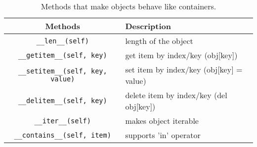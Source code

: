   \begin{definition}
    \begin{table}[H]
      \centering
      \begin{tabular}{|c|p{8cm}|}
        \hline
        \textbf{Methods} & \textbf{Description} \\
        \hline 
        \texttt{\_\_len\_\_(self)} & length of the object \\
        \hline
        \texttt{\_\_getitem\_\_(self, key)} & get item by index/key (obj[key]) \\
        \hline
        \texttt{\_\_setitem\_\_(self, key, value)} & set item by index/key (obj[key] = value) \\
        \hline
        \texttt{\_\_delitem\_\_(self, key)} & delete item by index/key (del obj[key]) \\
        \hline
        \texttt{\_\_iter\_\_(self)} & makes object iterable \\
        \hline
        \texttt{\_\_contains\_\_(self, item)} & supports 'in' operator \\
        \hline
      \end{tabular}
      \caption{Methods that make objects behave like containers.}
      \label{tab:container_behavior}
    \end{table}
  \end{definition}

